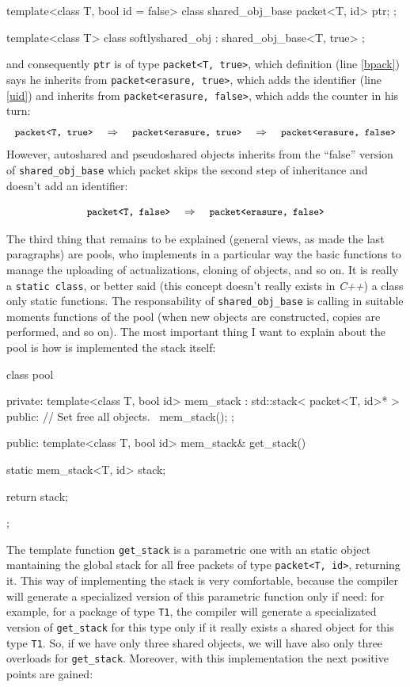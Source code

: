 \documentclass{article}
\begin{document}
\begin{Cpp}
  template<class T, bool id = false>
  class shared_obj_base
  {
     packet<T, id> ptr;
  };

  template<class T>
  class softlyshared_obj : shared_obj_base<T, true>
  {};
\end{Cpp}

\noindent and consequently \texttt{ptr} is of type \texttt{packet<T, true>},
which definition (line \ref{bpack}) says he inherits from
\texttt{packet<erasure, true>}, which adds the identifier (line \ref{uid}) and
inherits from \texttt{packet<erasure, false>}, which adds the counter in his
turn:
\[ \mbox{\texttt{\small{packet<T, true>}}} \quad
   \Rightarrow \quad \mbox{\texttt{\small{packet<erasure, true>}}} \quad
   \Rightarrow \quad \mbox{\texttt{\small{packet<erasure, false>}}} \]
However, autoshared and pseudoshared objects inherits from the ``false'' version of
\texttt{shared\_obj\_base} which packet skips the second step of inheritance and
doesn't add an identifier:

\[ \mbox{\texttt{\small{packet<T, false>}}} \quad
   \Rightarrow \quad \mbox{\texttt{\small{packet<erasure, false>}}} \]

The third thing that remains to be explained (general views, as made the last
paragraphs) are pools, who implements in a particular way the basic functions to
manage the uploading of actualizations, cloning of objects, and so on. It is
really a \texttt{static class}, or better said (this concept doesn't really
exists in \textit{C++}) a class only static functions. The responsability of
\texttt{shared\_obj\_base} is calling in suitable moments functions of the pool
(when new objects are constructed, copies are performed, and so on). The most
important thing I want to explain about the pool is how is implemented the stack
itself:

\begin{Cpp}
  class pool
  {
  private:
     template<class T, bool id>
     mem_stack : std::stack< packet<T, id>* >
     {
     public:
        // Set free all objects.
        ~mem_stack();
     };

  public:
     template<class T, bool id>
     mem_stack& get_stack()
     {
           static mem_stack<T, id> stack;

           return stack;
     }
  };
\end{Cpp}

The template function \texttt{get\_stack} is a parametric one with an static
object mantaining the global stack for all free packets of type
\texttt{packet<T, id>}, returning it. This way of implementing the stack is very
comfortable, because the compiler will generate a specialized version of this
parametric function only if need: for example, for a package of type
\texttt{T1}, the compiler will generate a specializated version of
\texttt{get\_stack} for this type only if it really exists a shared object for
this type \texttt{T1}. So, if we have only three shared objects, we will have
also only three overloads for \texttt{get\_stack}. Moreover, with this
implementation the next positive points are gained:
\end{document}
